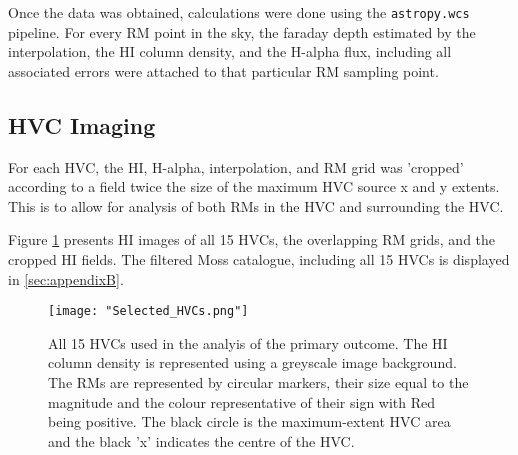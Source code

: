 Once the data was obtained, calculations were done using the \verb|astropy.wcs| pipeline. For every RM point in the sky, the faraday depth estimated by the interpolation, the HI column density, and the H-alpha flux, including all associated errors were attached to that particular RM sampling point.

\subsection{HVC Imaging}
\label{ssec:hvc_snapshot}

For each HVC, the HI, H-alpha, interpolation, and RM grid was 'cropped' according to a field twice the size of the maximum HVC source x and y extents. This is to allow for analysis of both RMs in the HVC and surrounding the HVC.


Figure \ref{fig:all_hvcs} presents HI images of all 15 HVCs, the overlapping RM grids, and the cropped HI fields. The filtered Moss catalogue, including all 15 HVCs is displayed in \ref{sec:appendixB}.

\begin{figure}
    \texttt{[image: "Selected\_HVCs.png"]}
    \centering
    \caption{All 15 HVCs used in the analyis of the primary outcome. The HI column density is represented using a greyscale image background. The RMs are represented by circular markers, their size equal to the magnitude and the colour representative of their sign with Red being positive. The black circle is the maximum-extent HVC area and the black 'x' indicates the centre of the HVC.}
    \label{fig:all_hvcs}
\end{figure}


